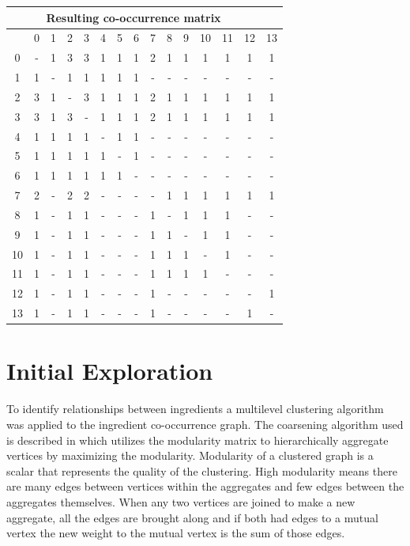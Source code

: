 \documentclass[conference]{IEEEtran}
\begin{document}
\vspace{.5cm}
\begin{table}[h!]
\small
\begin{tabular} { c|c c c c c c c c c c c c c c }
   \multicolumn{14}{c}{Resulting co-occurrence matrix}       \\
   \hline
      & 0 & 1 & 2 & 3 & 4 & 5 & 6 & 7 & 8 & 9 & 10 & 11 & 12 & 13 \\ 
   \hline
   0  & - & 1 & 3 & 3 & 1 & 1 & 1 & 2 & 1 & 1 & 1  & 1  & 1  & 1  \\
   1  & 1 & - & 1 & 1 & 1 & 1 & 1 & - & - & - & -  & -  & -  & -  \\
   2  & 3 & 1 & - & 3 & 1 & 1 & 1 & 2 & 1 & 1 & 1  & 1  & 1  & 1  \\
   3  & 3 & 1 & 3 & - & 1 & 1 & 1 & 2 & 1 & 1 & 1  & 1  & 1  & 1  \\
   4  & 1 & 1 & 1 & 1 & - & 1 & 1 & - & - & - & -  & -  & -  & -  \\
   5  & 1 & 1 & 1 & 1 & 1 & - & 1 & - & - & - & -  & -  & -  & -  \\
   6  & 1 & 1 & 1 & 1 & 1 & 1 & - & - & - & - & -  & -  & -  & -  \\
   7  & 2 & - & 2 & 2 & - & - & - & - & 1 & 1 & 1  & 1  & 1  & 1  \\
   8  & 1 & - & 1 & 1 & - & - & - & 1 & - & 1 & 1  & 1  & -  & -  \\
   9  & 1 & - & 1 & 1 & - & - & - & 1 & 1 & - & 1  & 1  & -  & -  \\
   10 & 1 & - & 1 & 1 & - & - & - & 1 & 1 & 1 & -  & 1  & -  & -  \\
   11 & 1 & - & 1 & 1 & - & - & - & 1 & 1 & 1 & 1  & -  & -  & -  \\
   12 & 1 & - & 1 & 1 & - & - & - & 1 & - & - & -  & -  & -  & 1  \\
   13 & 1 & - & 1 & 1 & - & - & - & 1 & - & - & -  & -  & 1  & -
\end{tabular}
\end{table}

\section{Initial Exploration}
To identify relationships between ingredients a multilevel clustering algorithm was applied
to the ingredient co-occurrence graph. The coarsening algorithm used is described in
\cite{Quiring19} which utilizes the modularity matrix to
hierarchically aggregate vertices by maximizing the modularity. Modularity of a clustered graph
is a scalar that represents the quality of the clustering. High modularity means there are many
edges between vertices within the aggregates and few edges between the aggregates themselves.
When any two vertices are joined to make a new aggregate, all the edges are brought along and
if both had edges to a mutual vertex the new weight to the mutual vertex is the sum of those
edges.
\end{document}
